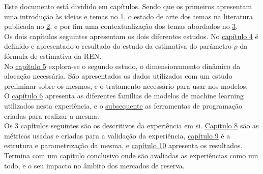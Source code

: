Este documento está dividido em capítulos. Sendo que os primeiros apresentam uma introdução às ideias e temas no \hyperref[ch:intro]{1}, o estado de arte dos temas na literatura publicada no \hyperref[ch:revisao]{2}, e por fim uma contextualização dos temas abordados no \hyperref[ch:contexto]{3}.\\
Os dois capítulos seguintes apresentam os dois diferentes estudos. No \hyperref[ch:estudo_1]{capítulo 4} é definido e apresentado o resultado do estudo da estimativa do parâmetro $\rho$ da fórmula de estimativa da REN.\\
No \hyperref[ch:estudo_2]{capítulo 5} explora-se o segundo estudo, o dimensionamento dinâmico da alocação necessária. São apresentados os dados utilizados com um estudo preliminar sobre os mesmos, e o tratamento necessário para usar nos modelos.\\
O \hyperref[ch:arch]{capítulo 6} apresenta as diferentes famílias de modelos de machine learning utilizados nesta experiência, e o \hyperref[ch:ferramentas]{subsequente} as ferramentas de programação criadas para realizar a mesma.\\
Os 3 capítulos seguintes são os descritivos da experiência em si. \hyperref[ch:metricas]{Capítulo 8} são as métricas usadas e criadas para a validação da experiência, \hyperref[ch:metodos]{capítulo 9} é a estrutura e parametrização da mesma, e \hyperref[ch:resultados_discussao]{capítulo 10} apresenta os resultados.\\
Termina com um \hyperref[ch:conclusao]{capítulo conclusivo} onde são avaliadas as experiências como um todo, e o seu impacto no âmbito dos mercados de reserva.\\